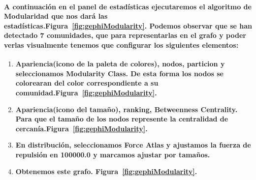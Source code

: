 \documentclass[11pt,spanish]{article}
\begin{document}
\paragraph*{A continuación en el panel de estadísticas ejecutaremos el algoritmo de Modularidad que nos dará las estadísticas.Figura~\ref{fig:gephiModularity}. 
Podemos observar que se han detectado 7 comunidades, que para representarlas en el grafo y poder verlas visualmente tenemos que configurar los siguientes elementos:}
\begin{enumerate}
	\item \textbf{Apariencia(icono de la paleta de colores), nodos, particion y seleccionamos Modularity Class. De esta forma los nodos se colorearan del color correspondiente a su comunidad.Figura~\ref{fig:gephiModularity}.}
	\item \textbf{Apariencia(icono del tamaño), ranking, Betweenness Centrality. Para que el tamaño de los nodos represente la centralidad de cercanía.Figura~\ref{fig:gephiModularity}.}
	\item \textbf{En distribución, seleccionamos Force Atlas y ajustamos la fuerza de repulsión en 100000.0 y marcamos ajustar por tamaños.}
	\item \textbf{Obtenemos este grafo. Figura~\ref{fig:gephiModularity}.}
\end{enumerate}
\end{document}
